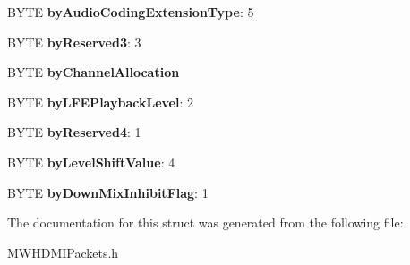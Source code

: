 \begin{DoxyCompactItemize}
\item 
\hypertarget{struct__HDMI__AUDIO__INFOFRAME__PAYLOAD_abdb938229eb314bc07611a5d2485c4b2}{B\-Y\-T\-E {\bfseries by\-Audio\-Coding\-Extension\-Type}\-: 5}\label{struct__HDMI__AUDIO__INFOFRAME__PAYLOAD_abdb938229eb314bc07611a5d2485c4b2}

\item 
\hypertarget{struct__HDMI__AUDIO__INFOFRAME__PAYLOAD_af752ed6ac7675d1ca12436df84fb3f73}{B\-Y\-T\-E {\bfseries by\-Reserved3}\-: 3}\label{struct__HDMI__AUDIO__INFOFRAME__PAYLOAD_af752ed6ac7675d1ca12436df84fb3f73}

\item 
\hypertarget{struct__HDMI__AUDIO__INFOFRAME__PAYLOAD_ab6a84cfa4162e3ba277e731b77616567}{B\-Y\-T\-E {\bfseries by\-Channel\-Allocation}}\label{struct__HDMI__AUDIO__INFOFRAME__PAYLOAD_ab6a84cfa4162e3ba277e731b77616567}

\item 
\hypertarget{struct__HDMI__AUDIO__INFOFRAME__PAYLOAD_a5ec217a57fa0bf9cbe6e28ef2395f9a8}{B\-Y\-T\-E {\bfseries by\-L\-F\-E\-Playback\-Level}\-: 2}\label{struct__HDMI__AUDIO__INFOFRAME__PAYLOAD_a5ec217a57fa0bf9cbe6e28ef2395f9a8}

\item 
\hypertarget{struct__HDMI__AUDIO__INFOFRAME__PAYLOAD_ad58d8e2717d73f76a4786a62fd7d51d8}{B\-Y\-T\-E {\bfseries by\-Reserved4}\-: 1}\label{struct__HDMI__AUDIO__INFOFRAME__PAYLOAD_ad58d8e2717d73f76a4786a62fd7d51d8}

\item 
\hypertarget{struct__HDMI__AUDIO__INFOFRAME__PAYLOAD_aa786574b7e4367e959ec11659fe972d4}{B\-Y\-T\-E {\bfseries by\-Level\-Shift\-Value}\-: 4}\label{struct__HDMI__AUDIO__INFOFRAME__PAYLOAD_aa786574b7e4367e959ec11659fe972d4}

\item 
\hypertarget{struct__HDMI__AUDIO__INFOFRAME__PAYLOAD_ad67587ae0ad6a99df7373bf5d04c9945}{B\-Y\-T\-E {\bfseries by\-Down\-Mix\-Inhibit\-Flag}\-: 1}\label{struct__HDMI__AUDIO__INFOFRAME__PAYLOAD_ad67587ae0ad6a99df7373bf5d04c9945}

\end{DoxyCompactItemize}


The documentation for this struct was generated from the following file\-:\begin{DoxyCompactItemize}
\item 
M\-W\-H\-D\-M\-I\-Packets.\-h\end{DoxyCompactItemize}
